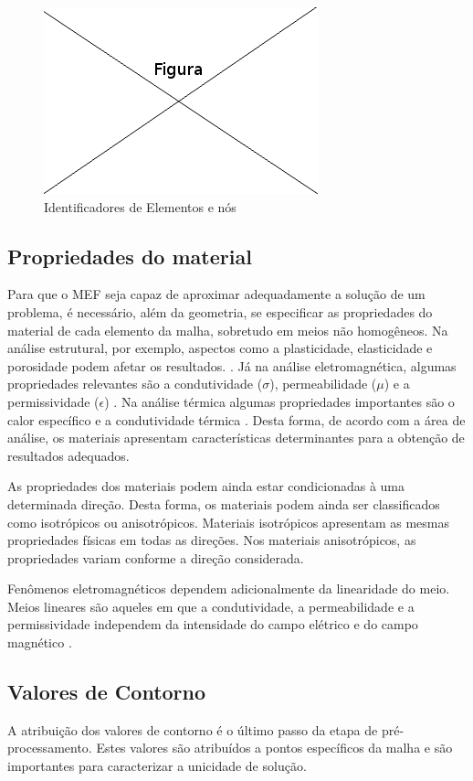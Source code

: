 \begin{figure}[!htb]
\centering
\includegraphics[scale=0.5]{figuras/temp.png}
\caption{Identificadores de Elementos e nós}
\label{fig:numeracao}
\end{figure}

\subsection{Propriedades do material}
Para que o MEF seja capaz de aproximar adequadamente a solução de um problema, é necessário, além da geometria, se especificar as propriedades do material de cada elemento da malha, sobretudo em meios não homogêneos. Na análise estrutural, por exemplo, aspectos como a plasticidade, elasticidade e porosidade podem afetar os resultados. \citep[p. 250]{desai}. Já na análise eletromagnética, algumas propriedades relevantes são a condutividade ($\sigma$), permeabilidade ($\mu$) e a permissividade ($\epsilon$) \citep[p. 3]{volakis}. Na análise térmica algumas propriedades importantes são o calor específico e a condutividade térmica \citep[p. 251]{desai}.
Desta forma, de acordo com a área de análise, os materiais apresentam características determinantes para a obtenção de resultados adequados.

As propriedades dos materiais podem ainda estar condicionadas à uma determinada direção. Desta forma, os materiais podem ainda ser classificados como isotrópicos ou anisotrópicos\citep[p. 20]{sadiku}.  Materiais isotrópicos apresentam as mesmas propriedades físicas em todas as direções. Nos materiais anisotrópicos, as propriedades variam conforme a direção considerada.

Fenômenos eletromagnéticos dependem adicionalmente da linearidade do meio. Meios lineares são aqueles em que a condutividade, a permeabilidade e a permissividade independem da intensidade do campo elétrico e do campo magnético \citep[p. 20]{sadiku} .


\subsection{Valores de Contorno}
A atribuição dos valores de contorno é o último passo da etapa de pré- processamento. Estes valores são atribuídos a pontos específicos da malha e são importantes para caracterizar a unicidade de solução. \citep[p. 7]{zien}

